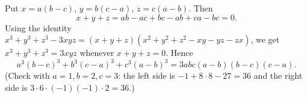 Put $x=a(b-c)$, $y=b(c-a)$, $z=c(a-b)$. Then
\[
x+y+z=ab-ac+bc-ab+ca-bc=0 .
\]
Using the identity $x^3+y^3+z^3-3xyz=(x+y+z)(x^2+y^2+z^2-xy-yz-zx)$, we get $x^3+y^3+z^3=3xyz$ whenever $x+y+z=0$. Hence
\[
a^3(b-c)^3+b^3(c-a)^3+c^3(a-b)^3=\boxed{3abc(a-b)(b-c)(c-a)}.
\]
(Check with $a=1,b=2,c=3$: the left side is $-1+8\cdot8-27=36$ and the right side is $3\cdot6\cdot(-1)(-1)\cdot2=36$.)
